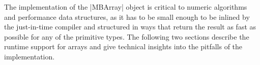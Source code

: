 The implementation of the |MBArray| object is critical to numeric algorithms and performance data structures, as it has to be small enough to be inlined by the just-in-time compiler and structured in ways that return the result as fast as possible for any of the primitive types. The following two sections describe the runtime support for arrays and give technical insights into the pitfalls of the implementation.